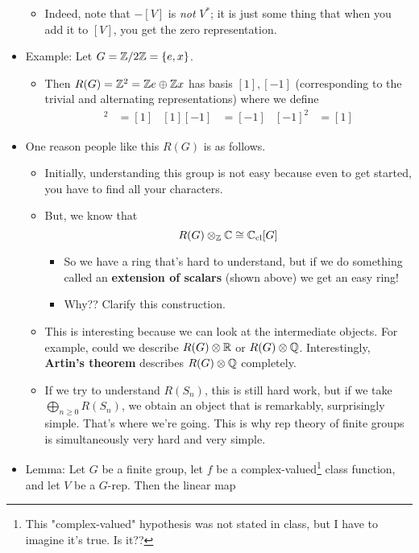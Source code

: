 \documentclass[../notes.tex]{subfiles}
\begin{document}
\begin{itemize}
\begin{itemize}
        \item Indeed, note that $-[V]$ is \emph{not} $V^*$; it is just some thing that when you add it to $[V]$, you get the zero representation.
    \end{itemize}
    \item Example: Let $G=\mathbb{Z}/2\mathbb{Z}=\{e,x\}$.
    \begin{itemize}
        \item Then $R(G)=\mathbb{Z}^2=\mathbb{Z} e\oplus\mathbb{Z} x$ has basis $[1],[-1]$ (corresponding to the trivial and alternating representations) where we define
        \begin{align*}
            [1]^2 &= [1]&
            [1][-1] &= [-1]&
            [-1]^2 &= [1]
        \end{align*}
    \end{itemize}
    \item One reason people like this $R(G)$ is as follows.
    \begin{itemize}
        \item Initially, understanding this group is not easy because even to get started, you have to find all your characters.
        \item But, we know that
        \begin{equation*}
            R(G)\otimes_{\mathbb{Z}}\mathbb{C} \cong \mathbb{C}_\text{cl}[G]
        \end{equation*}
        \begin{itemize}
            \item So we have a ring that's hard to understand, but if we do something called an \textbf{extension of scalars} (shown above) we get an easy ring!
            \item Why?? Clarify this construction.
        \end{itemize}
        \item This is interesting because we can look at the intermediate objects. For example, could we describe $R(G)\otimes\mathbb{R}$ or $R(G)\otimes\mathbb{Q}$. Interestingly, \textbf{Artin's theorem} describes $R(G)\otimes\mathbb{Q}$ completely.
        \item If we try to understand $R(S_n)$, this is still hard work, but if we take $\bigoplus_{n\geq 0}R(S_n)$, we obtain an object that is remarkably, surprisingly simple. That's where we're going. This is why rep theory of finite groups is simultaneously very hard and very simple.
    \end{itemize}
    \item Lemma: Let $G$ be a finite group, let $f$ be a complex-valued\footnote{This "complex-valued" hypothesis was not stated in class, but I have to imagine it's true. Is it??} class function, and let $V$ be a $G$-rep. Then the linear map

\end{itemize}
\end{document}
